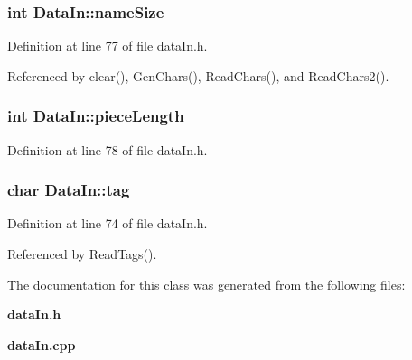 \subsubsection{\setlength{\rightskip}{0pt plus 5cm}int {\bf Data\-In::name\-Size}}\label{classDataIn_o10}




Definition at line 77 of file data\-In.h.

Referenced by clear(), Gen\-Chars(), Read\-Chars(), and Read\-Chars2().
\subsubsection{\setlength{\rightskip}{0pt plus 5cm}int {\bf Data\-In::piece\-Length}}\label{classDataIn_o11}




Definition at line 78 of file data\-In.h.
\subsubsection{\setlength{\rightskip}{0pt plus 5cm}char {\bf Data\-In::tag}}\label{classDataIn_o8}




Definition at line 74 of file data\-In.h.

Referenced by Read\-Tags().

The documentation for this class was generated from the following files:\begin{CompactItemize}
\item 
{\bf data\-In.h}\item 
{\bf data\-In.cpp}\end{CompactItemize}
